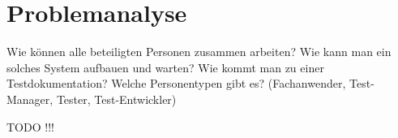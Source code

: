 \chapter{Problemanalyse}
\label{cha:Problemanalyse}

Wie können alle beteiligten Personen zusammen arbeiten?
Wie kann man ein solches System aufbauen und warten?
Wie kommt man zu einer Testdokumentation?
Welche Personentypen gibt es? (Fachanwender, Test-Manager, Tester, Test-Entwickler)

TODO !!!

